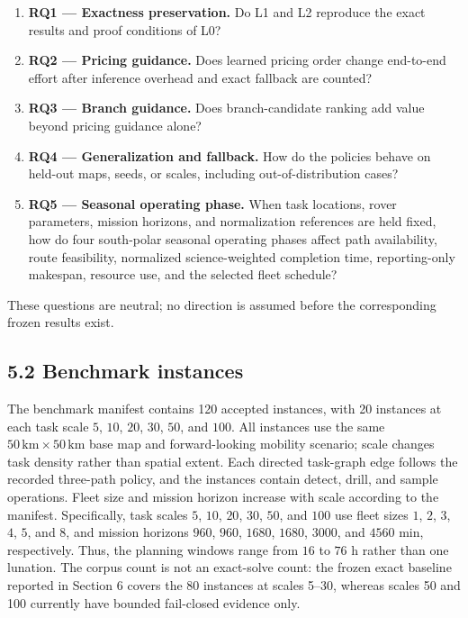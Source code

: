 \documentclass[
  11pt,
]{article}
\providecommand{\tightlist}{%
  \setlength{\itemsep}{0pt}\setlength{\parskip}{0pt}}
\begin{document}
\begin{enumerate}
\def\labelenumi{\arabic{enumi}.}
\tightlist
\item
  \textbf{RQ1 --- Exactness preservation.} Do L1 and L2 reproduce the
  exact results and proof conditions of L0?
\item
  \textbf{RQ2 --- Pricing guidance.} Does learned pricing order change
  end-to-end effort after inference overhead and exact fallback are
  counted?
\item
  \textbf{RQ3 --- Branch guidance.} Does branch-candidate ranking add
  value beyond pricing guidance alone?
\item
  \textbf{RQ4 --- Generalization and fallback.} How do the policies
  behave on held-out maps, seeds, or scales, including
  out-of-distribution cases?
\item
  \textbf{RQ5 --- Seasonal operating phase.} When task locations, rover
  parameters, mission horizons, and normalization references are held
  fixed, how do four south-polar seasonal operating phases affect path
  availability, route feasibility, normalized science-weighted
  completion time, reporting-only makespan, resource use, and the
  selected fleet schedule?
\end{enumerate}

These questions are neutral; no direction is assumed before the
corresponding frozen results exist.

\hypertarget{benchmark-instances}{%
\subsection{5.2 Benchmark instances}\label{benchmark-instances}}

The benchmark manifest contains 120 accepted instances, with 20
instances at each task scale \(5\), \(10\), \(20\), \(30\), \(50\), and
\(100\). All instances use the same
\(50\,\mathrm{km}\times50\,\mathrm{km}\) base map and forward-looking
mobility scenario; scale changes task density rather than spatial
extent. Each directed task-graph edge follows the recorded three-path
policy, and the instances contain detect, drill, and sample operations.
Fleet size and mission horizon increase with scale according to the
manifest. Specifically, task scales \(5\), \(10\), \(20\), \(30\),
\(50\), and \(100\) use fleet sizes \(1\), \(2\), \(3\), \(4\), \(5\),
and \(8\), and mission horizons \(960\), \(960\), \(1680\), \(1680\),
\(3000\), and \(4560\) min, respectively. Thus, the planning windows
range from \(16\) to \(76\) h rather than one lunation. The corpus count
is not an exact-solve count: the frozen exact baseline reported in
Section 6 covers the 80 instances at scales 5--30, whereas scales 50 and
100 currently have bounded fail-closed evidence only.
\end{document}

